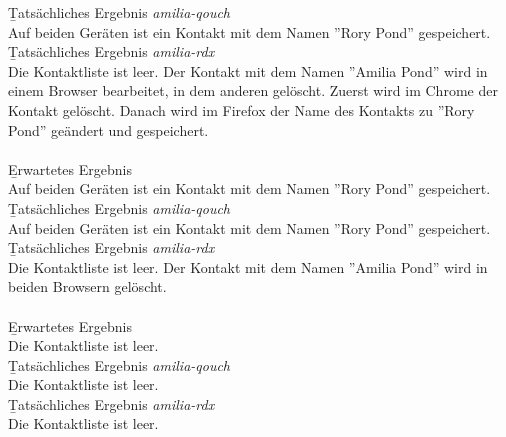 \b{Tatsächliches Ergebnis \it{amilia-qouch}}\\
Auf beiden Geräten ist ein Kontakt mit dem Namen ''Rory Pond'' gespeichert.\\
\b{Tatsächliches Ergebnis \it{amilia-rdx}}\\
Die Kontaktliste ist leer.
%
Der Kontakt mit dem Namen ''Amilia Pond'' wird in einem Browser bearbeitet, in dem anderen gelöscht.
Zuerst wird im Chrome der Kontakt gelöscht. 
Danach wird im Firefox der Name des Kontakts zu ''Rory Pond'' geändert und gespeichert.\\\\
%
\b{Erwartetes Ergebnis}\\
Auf beiden Geräten ist ein Kontakt mit dem Namen ''Rory Pond'' gespeichert.\\
\b{Tatsächliches Ergebnis \it{amilia-qouch}}\\
Auf beiden Geräten ist ein Kontakt mit dem Namen ''Rory Pond'' gespeichert.\\
\b{Tatsächliches Ergebnis \it{amilia-rdx}}\\
Die Kontaktliste ist leer.
%
Der Kontakt mit dem Namen ''Amilia Pond'' wird in beiden Browsern gelöscht.\\\\
\b{Erwartetes Ergebnis}\\
Die Kontaktliste ist leer.\\
\b{Tatsächliches Ergebnis \it{amilia-qouch}}\\
Die Kontaktliste ist leer.\\
\b{Tatsächliches Ergebnis \it{amilia-rdx}}\\
Die Kontaktliste ist leer.